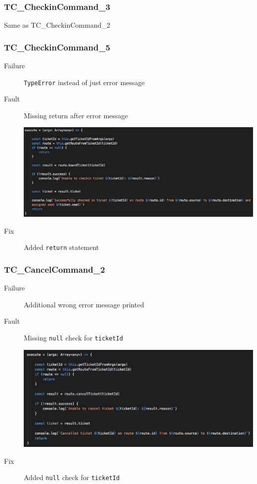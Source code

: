 \documentclass[11pt]{article}
\begin{document}
\subsubsection{TC\_CheckinCommand\_3}
\label{sec:org7c13df2}

Same as TC\_CheckinCommand\_2

\subsubsection{TC\_CheckinCommand\_5}
\label{sec:orgbf3b162}

\begin{description}
\item[{Failure}] \texttt{TypeError} instead of just error message
\item[{Fault}] Missing return after error message
\begin{center}
\includegraphics[width=.9\linewidth]{./Iteration3.rtfd/Pasted Graphic 11.tiff.png}
\end{center}
\item[{Fix}] Added \texttt{return} statement
\end{description}

\subsubsection{TC\_CancelCommand\_2}
\label{sec:orgec90d75}

\begin{description}
\item[{Failure}] Additional wrong error message printed
\item[{Fault}] Missing \texttt{null} check for \texttt{ticketId}
\begin{center}
\includegraphics[width=.9\linewidth]{./Iteration3.rtfd/Pasted Graphic 12.tiff.png}
\end{center}
\item[{Fix}] Added \texttt{null} check for \texttt{ticketId}
\end{description}
\end{document}
